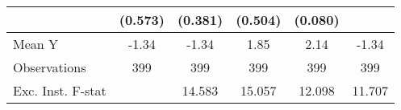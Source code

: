 {\begin{tabular}{l*{5}{c}}
            &     (0.573)         &     (0.381)         &     (0.504)         &     (0.080)         &                     \\
\midrule
Mean Y      &       -1.34         &       -1.34         &        1.85         &        2.14         &       -1.34         \\
Observations&         399         &         399         &         399         &         399         &         399         \\
Exc. Inst. F-stat&                     &      14.583         &      15.057         &      12.098         &      11.707         \\
\bottomrule
\end{tabular}
}
